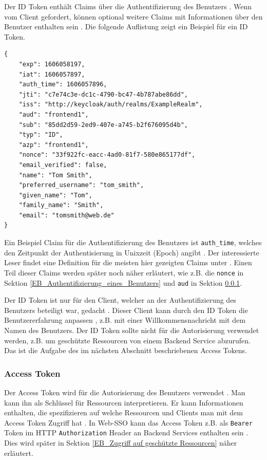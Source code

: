 Der ID Token enthält Claims über die Authentifizierung des Benutzers \cite[ID Token]{EB4}. Wenn vom Client gefordert, können optional weitere Claims mit Informationen über den Benutzer enthalten sein \cite[ID Token]{EB4}. Die folgende Auflistung zeigt ein Beispiel für ein ID Token.

\begin{lstlisting}[caption=Beispiel ID Token, captionpos=b]
{
	"exp": 1606058197,
	"iat": 1606057897,
	"auth_time": 1606057896,
	"jti": "c7e74c3e-dc1c-4790-bc47-4b787abe86dd",
	"iss": "http://keycloak/auth/realms/ExampleRealm",
	"aud": "frontend1",
	"sub": "85dd2d59-2ed9-407e-a745-b2f676095d4b",
	"typ": "ID",
	"azp": "frontend1",
	"nonce": "33f922fc-eacc-4ad0-81f7-580e865177df",
	"email_verified": false,
	"name": "Tom Smith",
	"preferred_username": "tom_smith",
	"given_name": "Tom",
	"family_name": "Smith",
	"email": "tomsmith@web.de"
}
\end{lstlisting}

Ein Beispiel Claim für die Authentifizierung des Benutzers ist \texttt{auth\_time}, welches den Zeitpunkt der Authentisierung in Unixzeit (Epoch) angibt \cite[ID Token]{EB4}. Der interessierte Leser findet eine Definition für die meisten hier gezeigten Claims unter \cite{EB7}. Einen Teil dieser Claims werden später noch näher erläutert, wie z.B. die \texttt{nonce} in Sektion \ref{EB_Authentifizierung_eines_Benutzers} und \texttt{aud} in Sektion \ref{EB_AccessToken}.

Der ID Token ist nur für den Client, welcher an der Authentifizierung des Benutzers beteiligt war, gedacht \cite{EB59}. Dieser Client kann durch den ID Token die Benutzererfahrung anpassen \cite[ID tokens]{EB8}, z.B. mit einer Willkommensnachricht mit dem Namen des Benutzers. Der ID Token sollte nicht für die Autorisierung verwendet werden, z.B. um geschützte Ressourcen von einem Backend Service abzurufen. Das ist die Aufgabe des im nächsten Abschnitt beschriebenen Access Tokens.

\subsubsection{Access Token} \label{EB_AccessToken}

Der Access Token wird für die Autorisierung des Benutzers verwendet \cite{SSEB_RFC6749}. Man kann ihn als Schlüssel für Ressourcen interpretieren. Er kann Informationen enthalten, die spezifizieren auf welche Ressourcen und Clients man mit dem Access Token Zugriff hat \cite[Audience Support]{SSEB_keycloakDocs}. In Web-SSO kann das Access Token z.B. als \texttt{Bearer} Token im HTTP \texttt{Authorization} Header an Backend Services enthalten sein \cite{SSEB_RFC6750}. Dies wird später in Sektion \ref{EB_Zugriff auf geschützte Ressourcen} näher erläutert.

